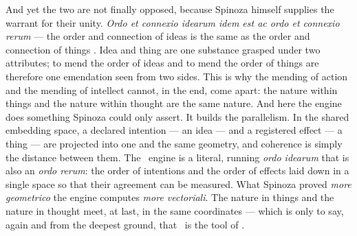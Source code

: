 And yet the two are not finally opposed, because Spinoza himself supplies the
warrant for their unity. \emph{Ordo et connexio idearum idem est ac ordo et
connexio rerum} --- the order and connection of ideas is the same as the order and
connection of things \parencite[II.P7]{spinoza1994ethics}. Idea and thing are one
substance grasped under two attributes; to mend the order of ideas and to mend the
order of things are therefore one emendation seen from two sides. This is why the
mending of action and the mending of intellect cannot, in the end, come apart: the
nature within things and the nature within thought are the same nature. And here
the engine does something Spinoza could only assert. It builds the parallelism. In
the shared embedding space, a declared intention --- an idea --- and a registered
effect --- a thing --- are projected into one and the same geometry, and coherence
is simply the distance between them. The \physis\ engine is a literal, running
\emph{ordo idearum} that is also an \emph{ordo rerum}: the order of intentions and
the order of effects laid down in a single space so that their agreement can be
measured. What Spinoza proved \emph{more geometrico} the engine computes
\emph{more vectoriali}. The nature in things and the nature in thought meet, at
last, in the same coordinates --- which is only to say, again and from the deepest
ground, that \praxis\ is the tool of \physis.
